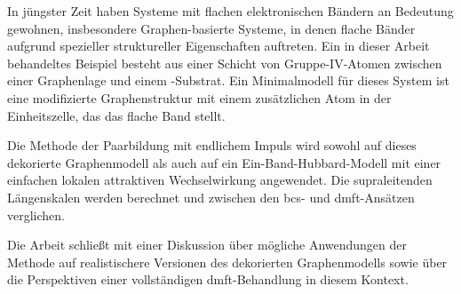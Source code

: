 \documentclass[../main.tex]{subfiles}
\begin{document}
In jüngster Zeit haben Systeme mit flachen elektronischen Bändern an Bedeutung gewohnen, insbesondere Graphen-basierte Systeme, in denen flache Bänder aufgrund spezieller struktureller Eigenschaften auftreten. Ein in dieser Arbeit behandeltes Beispiel besteht aus einer Schicht von Gruppe-IV-Atomen zwischen einer Graphenlage und einem -Substrat. Ein Minimalmodell für dieses System ist eine modifizierte Graphenstruktur mit einem zusätzlichen Atom in der Einheitszelle, das das flache Band stellt.

Die Methode der Paarbildung mit endlichem Impuls wird sowohl auf dieses dekorierte Graphenmodell als auch auf ein Ein-Band-Hubbard-Modell mit einer einfachen lokalen attraktiven Wechselwirkung angewendet. Die supraleitenden Längenskalen werden berechnet und zwischen den \gls{bcs}- und \gls{dmft}-Ansätzen verglichen.

Die Arbeit schließt mit einer Diskussion über mögliche Anwendungen der Methode auf realistischere Versionen des dekorierten Graphenmodells sowie über die Perspektiven einer vollständigen \gls{dmft}-Behandlung in diesem Kontext.
\end{document}
